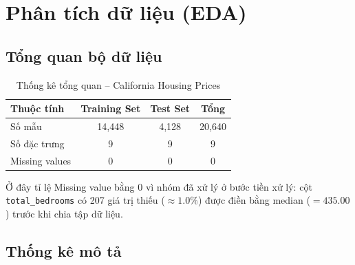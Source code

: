 \documentclass[12pt,a4paper]{article}
\begin{document}
\section{Phân tích dữ liệu (EDA)}
\label{sec:eda}

\subsection{Tổng quan bộ dữ liệu}

\begin{table}[H]
  \centering
  \caption{Thống kê tổng quan -- California Housing Prices}
  \label{tab:dataset_overview}
  \begin{tabular}{lccc}
    \toprule
    \textbf{Thuộc tính} & \textbf{Training Set} & \textbf{Test Set} & \textbf{Tổng} \\
    \midrule
    Số mẫu         & 14,448 & 4,128 & 20,640 \\
    Số đặc trưng   & 9      & 9     & 9      \\
    Missing values & 0      & 0     & 0      \\
    \bottomrule
  \end{tabular}
\end{table}

Ở đây tỉ lệ Missing value bằng 0 vì nhóm đã xử lý ở bước tiền xử lý:
cột \texttt{total\_bedrooms} có 207 giá trị thiếu ($\approx 1.0\%$) được
điền bằng median ($= 435.00$) trước khi chia tập dữ liệu.

\subsection{Thống kê mô tả}
\end{document}
